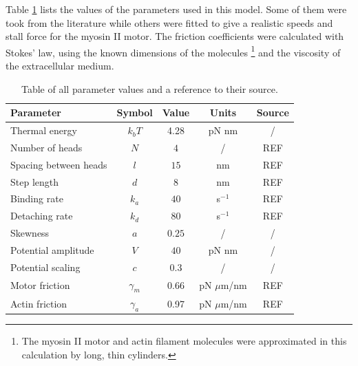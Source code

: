 \documentclass[aps,pre,onecolumn,showpacs,showkeys,a4paper]{revtex4}
\begin{document}
Table \ref{Tab: Parameters} lists the values of the parameters used in this model. Some of them were took from the literature while others were fitted to give a realistic speeds and stall force for the myosin II motor. The friction coefficients were calculated with Stokes' law, using the known dimensions of the molecules \footnote{The myosin II motor and actin filament molecules were approximated in this calculation by long, thin cylinders.} and the viscosity of the extracellular medium.
\begin{table}[h]
\centering
\begin{tabular}{lcccc}
Parameter & Symbol & Value & Units & Source\\
\hline\hline
Thermal energy & $k_{b}T$ & 4.28 & pN nm & /\\
Number of heads & $N$ & $4$ & / & REF\\
Spacing between heads & $l$ & $15$ & nm & REF\\
Step length & $d$ & $8$ & nm & REF\\
Binding rate & $k_{a}$ & $40$ & s$^{-1}$ & REF\\
Detaching rate & $k_{d}$ & $80$ & s$^{-1}$ & REF\\
Skewness & $a$ & $0.25$ & / & /\\
Potential amplitude & $V$ & $40$ & pN nm & /\\
Potential scaling & $c$ & $0.3$ & / & /\\
Motor friction & $\gamma_{m}$ & 0.66 & pN $\mu$m/nm & REF\\
Actin friction & $\gamma_{a}$ & 0.97 & pN $\mu$m/nm & REF\\
\end{tabular}
\caption{Table of all parameter values and a reference to their source.}
\label{Tab: Parameters}
\end{table}
\end{document}
